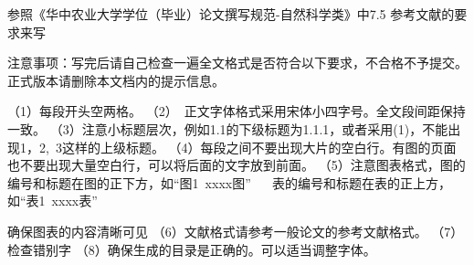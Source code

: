 \documentclass[12pt,a4paper,oneside]{ctexart}
\begin{document}
\par 参照《华中农业大学学位（毕业）论文撰写规范-自然科学类》中7.5 参考文献的要求来写
\par 注意事项：写完后请自己检查一遍全文格式是否符合以下要求，不合格不予提交。正式版本请删除本文档内的提示信息。
\par （1）每段开头空两格。
（2） 正文字体格式采用宋体小四字号。全文段间距保持一致。
（3）注意小标题层次，例如1.1的下级标题为1.1.1，或者采用(1)，不能出现1，2, 3这样的上级标题。
（4）每段之间不要出现大片的空白行。有图的页面也不要出现大量空白行，可以将后面的文字放到前面。
（5）注意图表格式，图的编号和标题在图的正下方，如“图1 xxxx图” 
     表的编号和标题在表的正上方，如“表1 xxxx表”
\par 确保图表的内容清晰可见
（6）文献格式请参考一般论文的参考文献格式。
（7）检查错别字
（8）确保生成的目录是正确的。可以适当调整字体。
\end{document}
